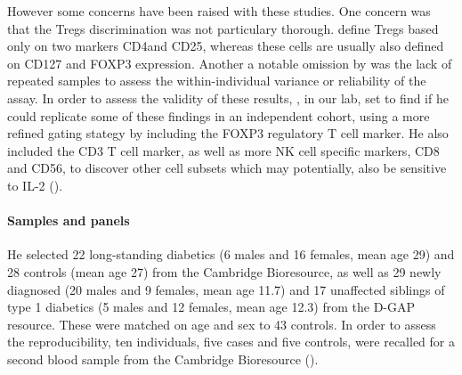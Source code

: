 However some concerns have been raised with these studies.
One concern was that the Tregs discrimination was not particulary thorough.
\citet{Long:2010ej} define Tregs based only on two markers CD4\positive and CD25\positive, whereas these cells are usually also defined on CD127 and FOXP3 expression.
Another a notable omission by \citet{Long:2010ej} was the lack of repeated samples to assess the within-individual variance or reliability of the assay.
In order to assess the validity of these results, , in our lab, set to find if he could replicate some of these findings in an independent cohort, using a more refined gating stategy by including the FOXP3 regulatory T cell marker.
He also included the CD3 T cell marker, as well as more NK cell specific markers, CD8 and CD56,
to discover other cell subsets which may potentially, also be sensitive to IL-2 ().

\paragraph{Samples and panels}

He selected 22 long-standing diabetics (6 males and 16 females, mean age 29) and 28 controls (mean age 27) from the Cambridge Bioresource, as well as 29 newly diagnosed (20 males and 9 females, mean age 11.7) and 17 unaffected siblings of type 1 diabetics (5 males and 12 females, mean age 12.3) from the \Gls{D-GAP} resource.  
These were matched on age and sex to 43 controls.
In order to assess the reproducibility, ten individuals, five cases and five controls, were recalled for a second blood sample from the Cambridge Bioresource ().

